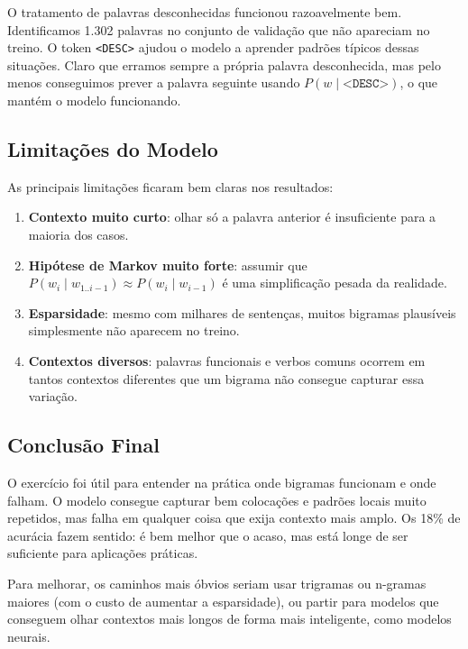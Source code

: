 \documentclass[12pt,a4paper]{article}
\begin{document}
O tratamento de palavras desconhecidas funcionou razoavelmente bem. Identificamos 1.302 palavras no conjunto de validação que não apareciam no treino. O token \texttt{<DESC>} ajudou o modelo a aprender padrões típicos dessas situações. Claro que erramos sempre a própria palavra desconhecida, mas pelo menos conseguimos prever a palavra seguinte usando $P(w\mid\texttt{<DESC>})$, o que mantém o modelo funcionando.

\subsection{Limitações do Modelo}

As principais limitações ficaram bem claras nos resultados:

\begin{enumerate}
    \item \textbf{Contexto muito curto}: olhar só a palavra anterior é insuficiente para a maioria dos casos.
    \item \textbf{Hipótese de Markov muito forte}: assumir que $P(w_i\mid w_{1..i-1}) \approx P(w_i\mid w_{i-1})$ é uma simplificação pesada da realidade.
    \item \textbf{Esparsidade}: mesmo com milhares de sentenças, muitos bigramas plausíveis simplesmente não aparecem no treino.
    \item \textbf{Contextos diversos}: palavras funcionais e verbos comuns ocorrem em tantos contextos diferentes que um bigrama não consegue capturar essa variação.
\end{enumerate}

\subsection{Conclusão Final}

O exercício foi útil para entender na prática onde bigramas funcionam e onde falham. O modelo consegue capturar bem colocações e padrões locais muito repetidos, mas falha em qualquer coisa que exija contexto mais amplo. Os 18\% de acurácia fazem sentido: é bem melhor que o acaso, mas está longe de ser suficiente para aplicações práticas.

Para melhorar, os caminhos mais óbvios seriam usar trigramas ou n-gramas maiores (com o custo de aumentar a esparsidade), ou partir para modelos que conseguem olhar contextos mais longos de forma mais inteligente, como modelos neurais.
\end{document}
